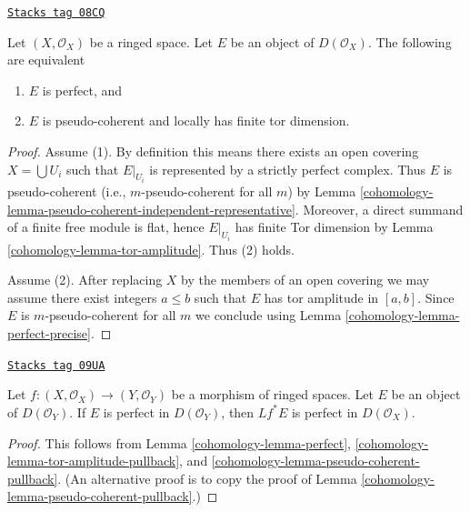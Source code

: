 \begin{lemma}[Perfect]
\label{cohomology-lemma-perfect}
\href{https://stacks.math.columbia.edu/tag/08CQ}{\texttt{Stacks tag 08CQ}}

Let $(X, \mathcal{O}_X)$ be a ringed space.
Let $E$ be an object of $D(\mathcal{O}_X)$.
The following are equivalent
\begin{enumerate}
\item $E$ is perfect, and
\item $E$ is pseudo-coherent and locally has finite tor dimension.
\end{enumerate}
\end{lemma}

\begin{proof}

Assume (1). By definition this means there exists an open covering
$X = \bigcup U_i$ such that $E|_{U_i}$ is represented by a
strictly perfect complex. Thus $E$ is pseudo-coherent (i.e.,
$m$-pseudo-coherent for all $m$) by
Lemma \ref{cohomology-lemma-pseudo-coherent-independent-representative}.
Moreover, a direct summand of a finite free module is flat, hence
$E|_{U_i}$ has finite Tor dimension by
Lemma \ref{cohomology-lemma-tor-amplitude}. Thus (2) holds.

\medskip\noindent
Assume (2). After replacing $X$ by the members of an open covering
we may assume there exist integers $a \leq b$ such that $E$
has tor amplitude in $[a, b]$. Since $E$ is $m$-pseudo-coherent
for all $m$ we conclude using Lemma \ref{cohomology-lemma-perfect-precise}.
\end{proof}

\begin{lemma}
\label{cohomology-lemma-perfect-pullback}
\href{https://stacks.math.columbia.edu/tag/09UA}{\texttt{Stacks tag 09UA}}

Let $f : (X, \mathcal{O}_X) \to (Y, \mathcal{O}_Y)$ be a morphism of ringed
spaces. Let $E$ be an object of $D(\mathcal{O}_Y)$. If $E$ is perfect in
$D(\mathcal{O}_Y)$, then $Lf^*E$ is perfect in $D(\mathcal{O}_X)$.
\end{lemma}

\begin{proof}

This follows from Lemma \ref{cohomology-lemma-perfect},
\ref{cohomology-lemma-tor-amplitude-pullback}, and
\ref{cohomology-lemma-pseudo-coherent-pullback}.
(An alternative proof is to copy the proof of
Lemma \ref{cohomology-lemma-pseudo-coherent-pullback}.)
\end{proof}

